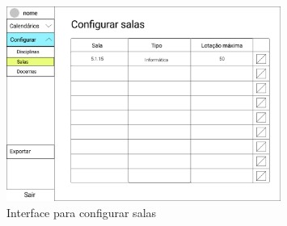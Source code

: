 \documentclass[11pt, twoside]{report}
\begin{document}
	\begin{figure}[H] 
		\centering 
		\includegraphics[width=0.8\textwidth,height=0.8\textheight,keepaspectratio]{image/prototipowireframes/configurarsalas}
		\caption{Interface para configurar salas}
		\label{interfaceconfsalas}
	\end{figure}
	
\end{document}
